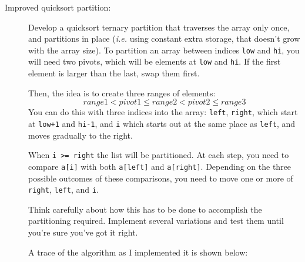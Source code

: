 \documentclass{article}
\begin{document}
\begin{description}
\item[Improved quicksort partition:] Develop a quicksort ternary partition that traverses
the array only once, and partitions in place ({\em i.e.} using constant extra storage,
that doesn't grow with the array size).  To partition
an array between indices \lstinline{low} and \lstinline{hi}, you will
need two pivots, which will be elements at \lstinline{low} and \lstinline{hi}.  If the
first element is larger than the last, swap them first.

Then, the idea is to create three ranges of elements:
\[ range1 < pivot1 \leq range2 < pivot2 \leq range3 \]
You can do this with three indices into the array: \lstinline{left}, \lstinline{right},
which start at \lstinline{low+1} and \lstinline{hi-1}, and \lstinline{i} which starts
out at the same place as \lstinline{left}, and moves gradually to the right.

When \lstinline{i >= right} the list will be partitioned.  At each step,
you need to compare \lstinline{a[i]} with both \lstinline{a[left]}
and \lstinline{a[right]}.  Depending on the three possible outcomes
of these comparisons, you need to move one or more of
\lstinline{right}, \lstinline{left}, and \lstinline{i}.

Think carefully about how this has to be done to accomplish the
partitioning required.  Implement several variations and test them
until you're sure you've got it right.

A trace of the algorithm as I implemented it is shown below:


\end{description}
\end{document}
